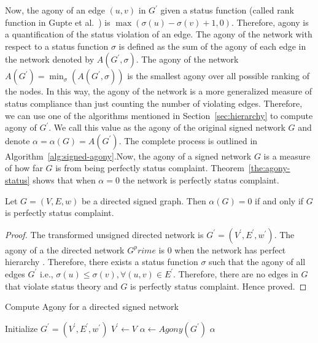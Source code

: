 Now, the agony of an edge $(u,v)$ in $G^\prime$ given a status function (called rank function in Gupte et al.\ \cite{gupte2011finding}) is $\max(\sigma(u)-\sigma(v)+1,0)$. Therefore, agony is a quantification of the status violation of an edge. The agony of the network with respect to a status function $\sigma$ is defined as the sum of the agony of each edge in the network denoted by $A(G^\prime,\sigma)$. The agony of the network $A(G^\prime)= \min_\sigma(A(G^\prime,\sigma))$ is the smallest agony over all possible ranking of the nodes. In this way, the agony of the network is a more generalized measure of status compliance than just counting the number of violating edges. Therefore, we can use one of the algorithms mentioned in Section~\ref{sec:hierarchy} to compute agony of $G^\prime$. We call this value as the agony of the original signed network $G$ and denote $\alpha = \alpha(G) = A(G^\prime)$. The complete process is outlined in Algorithm~\ref{alg:signed-agony}.Now, the agony of a signed network $G$ is a measure of how far $G$ is from being perfectly status complaint. Theorem~\ref{the:agony-status} shows that when $\alpha=0$ the network is perfectly status complaint. 

\begin{theorem}
\label{the:agony-status}
Let $G=(V,E,w)$ be a directed signed graph. Then $\alpha(G)=0$ if and only if $G$ is perfectly status complaint.
\end{theorem}
\begin{proof}
    The transformed unsigned directed network is $G^\prime=(V^\prime,E^\prime,w^\prime)$. The agony of a the directed network $G^prime$ is 0 when the network has perfect hierarchy \cite{gupte2011finding}. Therefore, there exists a status function $\sigma$ such that the agony of all edges $G^\prime$ i.e., $\sigma(u) \leq \sigma(v), \forall (u,v)\in E^\prime$. Therefore, there are no edges in $G$ that violate status theory and $G$ is perfectly status complaint. Hence proved.
\end{proof}

\begin{algorithm}[htp]
    \DontPrintSemicolon
    \caption{Compute Agony for a directed signed network }
    \label{alg:signed-agony}
    Initialize $G^\prime = (V^\prime,E^\prime,w^\prime)$\;
    $V^\prime \leftarrow V$\;
    $\alpha \leftarrow Agony(G^\prime)$\; 
    \Return $\alpha$\;
\end{algorithm}


